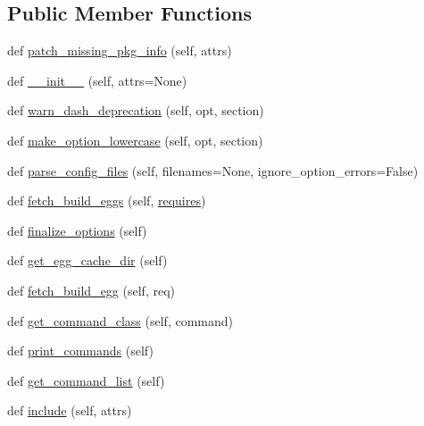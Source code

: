 \subsection*{Public Member Functions}
\begin{DoxyCompactItemize}
\item 
def \hyperlink{classsetuptools_1_1dist_1_1Distribution_a63d311a3a213090ba459bb9fc8878473}{patch\+\_\+missing\+\_\+pkg\+\_\+info} (self, attrs)
\item 
def \hyperlink{classsetuptools_1_1dist_1_1Distribution_a3ecc99f355b19d6327ec08139f2c069b}{\+\_\+\+\_\+init\+\_\+\+\_\+} (self, attrs=None)
\item 
def \hyperlink{classsetuptools_1_1dist_1_1Distribution_a04828e01a9df83726f714dc6578f7178}{warn\+\_\+dash\+\_\+deprecation} (self, opt, section)
\item 
def \hyperlink{classsetuptools_1_1dist_1_1Distribution_a21dad0a70f42d8ba4ae435d226d97c67}{make\+\_\+option\+\_\+lowercase} (self, opt, section)
\item 
def \hyperlink{classsetuptools_1_1dist_1_1Distribution_a41d3a53939167a813c13fde672ce3970}{parse\+\_\+config\+\_\+files} (self, filenames=None, ignore\+\_\+option\+\_\+errors=False)
\item 
def \hyperlink{classsetuptools_1_1dist_1_1Distribution_a3af6e048cd20731f68583089c6b06b57}{fetch\+\_\+build\+\_\+eggs} (self, \hyperlink{namespacesetuptools_1_1dist_a48826b3b3a814fd971719bfc038878d4}{requires})
\item 
def \hyperlink{classsetuptools_1_1dist_1_1Distribution_a7849615b07629cf6420a420ab46ea199}{finalize\+\_\+options} (self)
\item 
def \hyperlink{classsetuptools_1_1dist_1_1Distribution_a0da6e9ec6ef0ce3f8c60f61b20d31589}{get\+\_\+egg\+\_\+cache\+\_\+dir} (self)
\item 
def \hyperlink{classsetuptools_1_1dist_1_1Distribution_a17bce0b77bfb0a4d06aa9422f1e5e0bf}{fetch\+\_\+build\+\_\+egg} (self, req)
\item 
def \hyperlink{classsetuptools_1_1dist_1_1Distribution_a76159456291f4bb9ed2ccb935d480240}{get\+\_\+command\+\_\+class} (self, command)
\item 
def \hyperlink{classsetuptools_1_1dist_1_1Distribution_a7ea0a1191865dbac2d9110ce23f7461c}{print\+\_\+commands} (self)
\item 
def \hyperlink{classsetuptools_1_1dist_1_1Distribution_ad385b9a96d699328200db4d891549721}{get\+\_\+command\+\_\+list} (self)
\item 
def \hyperlink{classsetuptools_1_1dist_1_1Distribution_a2306d43f883208c7a145e26056ee4fc9}{include} (self, attrs)

\end{DoxyCompactItemize}
